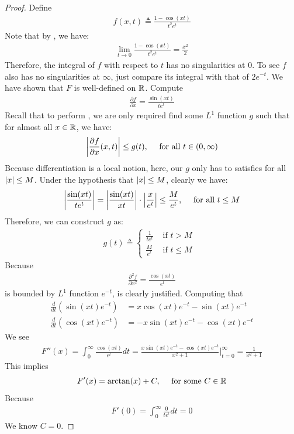 \documentclass{report}
\begin{document}
\begin{proof}
Define 
\begin{align*}
f(x,t)\triangleq \frac{1- \cos (xt)}{t^2e^t}
\end{align*}
Note that by  , we have: 
\begin{align*}
\lim_{t\to 0} \frac{1- \cos (xt)}{t^2e^t} =  \frac{x^2}{2}
\end{align*}
Therefore, the integral of $f$ with respect to  $t$ has no singularities at $0$. To see $f$ also has no singularities at $\infty$, just compare its integral with that of $2e^{-t}$. We have shown that $F$ is well-defined on  $\mathbb{R}$. Compute 
\begin{align*}
\frac{\partial f}{\partial x} = \frac{\sin (xt)}{te^t}
\end{align*}
Recall that  to perform    , we are only required find some $L^1$ function  $g$ such that for almost all $x\in\mathbb{R}$, we have: 
\begin{align}
\label{EQpafx}
  \left|\frac{\partial f}{\partial x}(x,t) \right| \leq g(t),\quad \text{ for all }t \in (0,\infty)
\end{align}
Because differentiation is a local notion, here, our $g$ only has to satisfies  for all $\left|x\right|\leq M$. Under the hypothesis that $\left|x\right|\leq M$, clearly we have: 
\begin{align*}
  \left|\frac{\sin (xt)}{te^t}\right|= \left|\frac{\sin (xt)}{xt}\right| \cdot \left|\frac{x}{e^t} \right| \leq \frac{M}{e^t},\quad \text{ for all }t \leq M
\end{align*}
Therefore, we can construct $g$ as: 
\begin{align*}
g(t)\triangleq \begin{cases}
  \frac{1}{te^t}& \text{ if  }t>M\\
  \frac{M}{e^t}& \text{ if $t \leq M$ } 
\end{cases}
\end{align*}
Because  
\begin{align*}
\frac{\partial^2 f}{\partial x^2} = \frac{\cos (xt)}{e^t}
\end{align*}
is bounded by  $L^1$ function $e^{-t}$,  is clearly justified. Computing that 
\begin{align*}
\frac{d}{dt} \left( \sin (xt)e^{-t} \right)&= x \cos (xt)e^{-t}- \sin (xt)e^{-t}  \\
\frac{d}{dt}\left(\cos (xt)e^{-t} \right)&=  -x \sin (xt)e^{-t}-\cos (xt)e^{-t}
\end{align*}
We see 
\begin{align*}
F''(x)=\int_0^{\infty} \frac{\cos (xt)}{e^t}dt= \frac{x \sin (xt)e^{-t}- \cos (xt)e^{-t}}{x^2+1} \Bigg  |_{t=0}^{\infty} = \frac{1}{x^2+1} 
\end{align*}
This implies 
\begin{align*}
F'(x)= \arctan (x) + C,\quad \text{ for some }C\in\mathbb{R}
\end{align*}
 Because 
 \begin{align*}
 F'(0)=\int_0^{\infty} \frac{0}{te^{^t}}dt=0 
 \end{align*}
 We know $C=0$. 
\end{proof}
\end{document}
